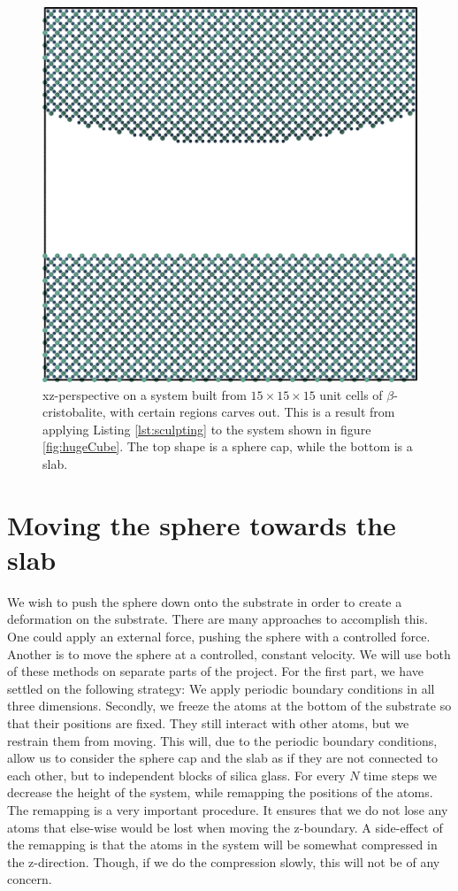 \documentclass[twoside,english]{uiofysmaster}
\begin{document}
\begin{figure}[H]
\centering
\includegraphics[width=0.5\linewidth]{figures/CreatingSystem/carved_xz.png}
\caption{xz-perspective on a system built from $15\times15\times15$ unit cells of $\beta$-cristobalite, with certain regions carves out. This is a result from applying Listing \ref{lst:sculpting} to the system shown in figure \ref{fig:hugeCube}. The top shape is a sphere cap, while the bottom is a slab.}
\label{fig:carvedxz}
\end{figure}


\section{Moving the sphere towards the slab} \label{sec:movingSphereDown}
We wish to push the sphere down onto the substrate in order to create a deformation on the substrate. 
There are many approaches to accomplish this. 
One could apply an external force, pushing the sphere with a controlled force. 
Another is to move the sphere at a controlled, constant velocity.  
We will use both of these methods on separate parts of the project.
For the first part, we have settled on the following strategy:
We apply periodic boundary conditions in all three dimensions. 
Secondly, we freeze the atoms at the bottom of the substrate so that their positions are fixed. 
They still interact with other atoms, but we restrain them from moving. 
This will, due to the periodic boundary conditions, allow us to consider the sphere cap and the slab as if they are not connected to each other, but to independent blocks of silica glass.  
For every $N$ time steps we decrease the height of the system, while remapping the positions of the atoms. 
The remapping is a very important procedure. 
It ensures that we do not lose any atoms that else-wise would be lost when moving the z-boundary. 
A side-effect of the remapping is that the atoms in the system will be somewhat compressed in the z-direction. 
Though, if we do the compression slowly, this will not be of any concern. 
\end{document}
